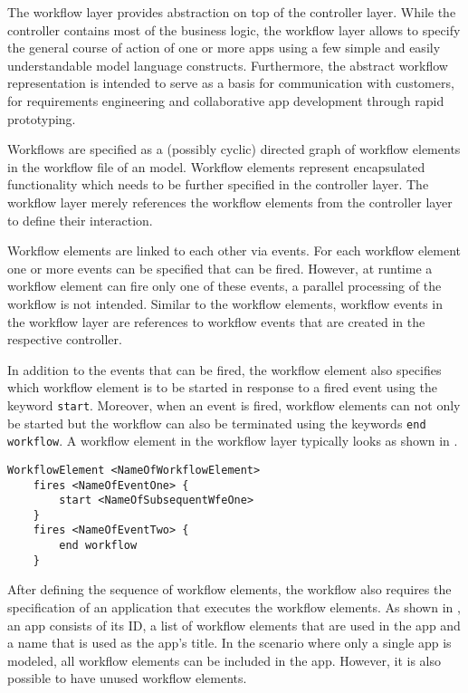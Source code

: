 
The workflow layer provides abstraction on top of the controller layer. While the controller contains most of the business logic, the workflow layer allows to specify the general course of action of one or more apps using a few simple and easily understandable model language constructs. Furthermore, the abstract workflow representation is intended to serve as a basis for communication with customers, \eg for requirements engineering and collaborative app development through rapid prototyping.

Workflows are specified as a (possibly cyclic) directed graph of workflow elements in the workflow file of an \MD model. Workflow elements represent encapsulated functionality which needs to be further specified in the controller layer. The workflow layer merely references the workflow elements from the controller layer to define their interaction.

Workflow elements are linked to each other via events. For each workflow element one or more events can be specified that can be fired. However, at runtime a workflow element can fire only one of these events, \ie a parallel processing of the workflow is not intended. Similar to the workflow elements, workflow events in the workflow layer are references to workflow events that are created in the respective controller.

In addition to the events that can be fired, the workflow element also specifies which workflow element is to be started in response to a fired event using the keyword {\lstinline!start!}. Moreover, when an event is fired, workflow elements can not only be started but the workflow can also be terminated using the keywords \lstinline!end workflow!.
A workflow element in the workflow layer typically looks as shown in .

\begin{lstlisting}[language=MD2, label=lst:wfe, caption=Workflow elements in the workflow layer]
 WorkflowElement <NameOfWorkflowElement>
 	fires <NameOfEventOne> {
		start <NameOfSubsequentWfeOne>
	}
	fires <NameOfEventTwo> {
		end workflow
	}
\end{lstlisting}

After defining the sequence of workflow elements, the workflow also requires the specification of an application that executes the workflow elements. As shown in , an app consists of its ID, a list of workflow elements that are used in the app and a name that is used as the app's title. In the scenario where only a single app is modeled, all workflow elements can be included in the app. However, it is also possible to have unused workflow elements. 

